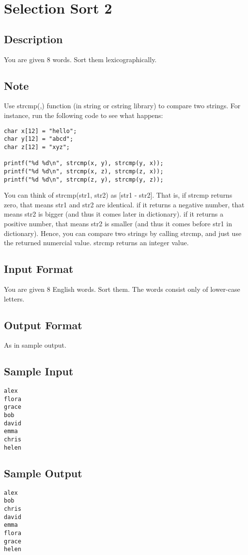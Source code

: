 \newpage

\section{Selection Sort 2}

\subsection*{Description}
You are given $8$ words.  Sort them lexicographically. 

\subsection*{Note}
Use strcmp(,) function (in string or cstring library) to compare two strings.
For instance, run the following code to see what happens:
\begin{verbatim}
char x[12] = "hello";
char y[12] = "abcd";
char z[12] = "xyz";

printf("%d %d\n", strcmp(x, y), strcmp(y, x));
printf("%d %d\n", strcmp(x, z), strcmp(z, x));
printf("%d %d\n", strcmp(z, y), strcmp(y, z));
\end{verbatim}

You can think of strcmp(str1, str2) as [str1 - str2].  That is, if strcmp returns zero, that means str1 and str2 are identical. if it returns a negative number, that means str2 is bigger (and thus it comes later in dictionary). if it returns a positive number, that means str2 is smaller (and thus it comes before str1 in dictionary). 
Hence, you can compare two strings by calling strcmp, and just use the returned numercial value. strcmp returns an integer value. 

\subsection*{Input Format}
You are given $8$ English words. Sort them. The words consist only of lower-case letters. 

\subsection*{Output Format}
As in sample output.

\subsection*{Sample Input}
\begin{verbatim}
alex
flora
grace
bob
david
emma
chris
helen
\end{verbatim}

\subsection*{Sample Output}
\begin{verbatim}
alex
bob
chris
david
emma
flora
grace
helen
\end{verbatim}



